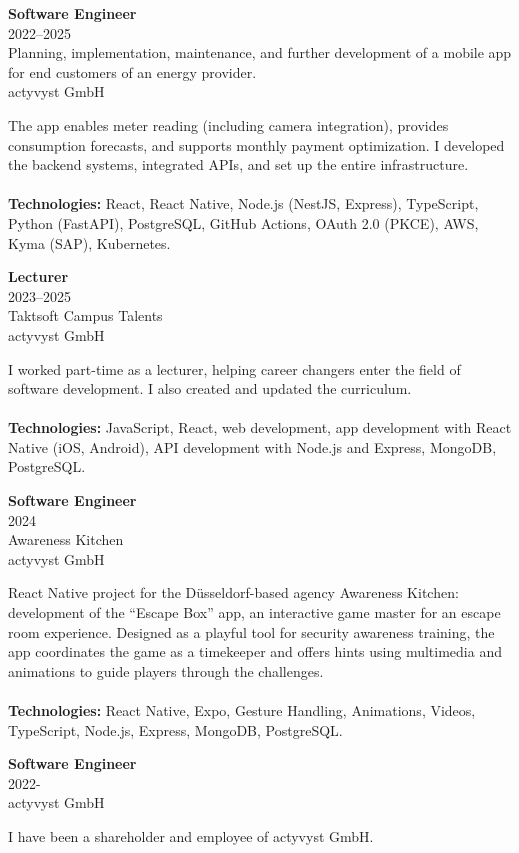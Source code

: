 \documentclass[a4paper,10pt]{article}
\newcommand{\experienceimg}[7]{
  \begin{adjustbox}{}
    \begin{minipage}[t]{0.25\textwidth}
      \textbf{\color{sectionblue}#1} \\
      {\color{sectiongray}#2} \\
      #3\\
      {\color{sectiongray}#4}
    \end{minipage}
    \hspace{1em}
    \begin{minipage}[t]{0.75\textwidth}
      #5\\
      \adjustbox{margin=0.5cm}{\texttt{[image: \#6]}}\\
      \textbf{Technologies:} #7
    \end{minipage}
  \end{adjustbox}
}
\newcommand{\experience}[4]{
  \begin{adjustbox}{}
    \begin{minipage}[t]{0.25\textwidth}
      \textbf{\color{sectionblue}#1} \\
      {\color{sectiongray}#2} \\
      #3\\
    \end{minipage}
    \hspace{1em}
    \begin{minipage}[t]{0.75\textwidth}
      #4\\
    \end{minipage}
  \end{adjustbox}
}
\begin{document}
  \experienceimg
    {Software Engineer}
    {2022–2025}
    {Planning, implementation, maintenance, and further development of a mobile app for end customers of an energy provider.}
    {actyvyst GmbH}
    {The app enables meter reading (including camera integration), provides consumption forecasts, and supports monthly payment optimization. I developed the backend systems, integrated APIs, and set up the entire infrastructure.}
    {assets/badenova.png}
    {React, React Native, Node.js (NestJS, Express), TypeScript, Python (FastAPI), PostgreSQL, GitHub Actions, OAuth 2.0 (PKCE), AWS, Kyma (SAP), Kubernetes.}

  \vspace{1em}{\color{sectionblue}\rule{\textwidth}{0.4pt}}\vspace{1em}

  \experienceimg
  {Lecturer}
  {2023–2025}
  {Taktsoft Campus Talents}
  {actyvyst GmbH}
  {I worked part-time as a lecturer, helping career changers enter the field of software development. I also created and updated the curriculum.}
  {assets/logo-campus-talents.png}
  {JavaScript, React, web development, app development with React Native (iOS, Android), API development with Node.js and Express, MongoDB, PostgreSQL.}

  \vspace{1em}{\color{sectionblue}\rule{\textwidth}{0.4pt}}\vspace{1em}

  \experienceimg
  {Software Engineer}
  {2024}
  {Awareness Kitchen}
  {actyvyst GmbH}
  {React Native project for the Düsseldorf-based agency Awareness Kitchen: development of the “Escape Box” app, an interactive game master for an escape room experience. Designed as a playful tool for security awareness training, the app coordinates the game as a timekeeper and offers hints using multimedia and animations to guide players through the challenges.}
  {assets/awareness-kitchen.png}
  {React Native, Expo, Gesture Handling, Animations, Videos, TypeScript, Node.js, Express, MongoDB, PostgreSQL.}

  \vspace{1em}{\color{sectionblue}\rule{\textwidth}{0.4pt}}\vspace{1em}

  \experience
  {Software Engineer}
  {2022-}
  {actyvyst GmbH}
  {I have been a shareholder and employee of actyvyst GmbH.}

  \vspace{1em}{\color{sectionblue}\rule{\textwidth}{0.4pt}}\vspace{1em}
\end{document}
